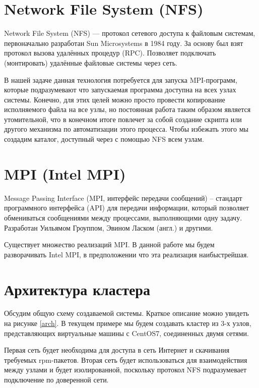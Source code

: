 \section{Network File System (NFS)}

Network File System (NFS) — протокол сетевого доступа к файловым системам,
первоначально разработан Sun Microsystems в 1984 году. За основу был взят протокол
вызова удалённых процедур (RPC). Позволяет подключать (монтировать) удалённые
файловые системы через сеть.

В нашей задаче данная технология потребуется для запуска MPI-программ, которые
подразумевают что запускаемая программа доступна на всех узлах системы.
Конечно, для этих целей можно просто провести копирование исполняемого файла
на все узлы, но постоянная работа таким образом является утомительной, что
в конечном итоге повлечет за собой создание скрипта или другого механизма
по автоматизации этого процесса. Чтобы избежать этого мы создадим каталог,
доступный через с помощью NFS всем узлам.

\section{MPI (Intel MPI)}

\textmd{Message Passing Interface} (MPI, интерфейс передачи сообщений) -- стандарт
программного интерфейса (API) для передачи информации, который позволяет
обмениваться сообщениями между процессами, выполняющими одну задачу.
Разработан Уильямом Гроуппом, Эвином Ласком (англ.) и другими\cite{mpi}.

Существует множество реализаций MPI. В данной работе мы будем разворачивать
\textmd{Intel MPI}\cite{intel-mpi}, в предположении что эта реализация
наибыстрейшая.

\section{Архитектура кластера}

Обсудим общую схему создаваемой системы. Краткое описание можно увидеть на
рисунке \ref{arch}. В текущем примере мы будем создавать кластер из 3-х узлов,
представляющих виртуальные машины с \textmd{CentOS7}, соединенных двумя сетями.

Первая сеть будет необходима для доступа в сеть Интернет и скачивания
требуемых rpm-пакетов. Вторая сеть будет использоваться для взаимодействия между
узлами и будет изолированной, поскольку протокол NFS подразумевает подключение
по доверенной сети.

